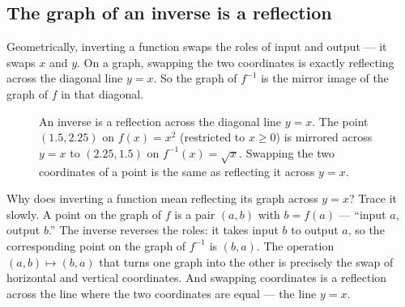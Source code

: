 \subsection{The graph of an inverse is a reflection}
Geometrically, inverting a function swaps the roles of input and output --- it swaps
$x$ and $y$. On a graph,
swapping the two coordinates is exactly reflecting across the diagonal line $y=x$.
So the graph of $f^{-1}$ is the mirror image of the graph of $f$ in that diagonal.
\begin{figure}[htbp]
\centering
{}
\caption{An inverse is a reflection across the diagonal line $y=x$. The point $(1.5,2.25)$ on
$f(x)=x^2$ (restricted to $x\ge 0$) is mirrored across $y=x$ to $(2.25,1.5)$ on
$f^{-1}(x)=\sqrt{x}$. Swapping the two coordinates of a point is the same as reflecting it across $y=x$.}
\label{ch02:fig-inverse}
\end{figure}

\begin{whybox}
Why does inverting a function mean reflecting its graph across $y=x$? Trace it
slowly. A point on the graph of $f$ is a pair $(a, b)$ with $b = f(a)$ --- ``input
$a$, output $b$.'' The inverse reverses the roles: it takes input $b$ to output
$a$, so the corresponding point on the graph of $f^{-1}$ is $(b, a)$. The
operation $(a,b) \mapsto (b,a)$ that turns one graph into the other is precisely
the swap of horizontal and vertical coordinates. And swapping coordinates is a
reflection across the line where the two coordinates are equal --- the line $y=x$.
\end{whybox}

